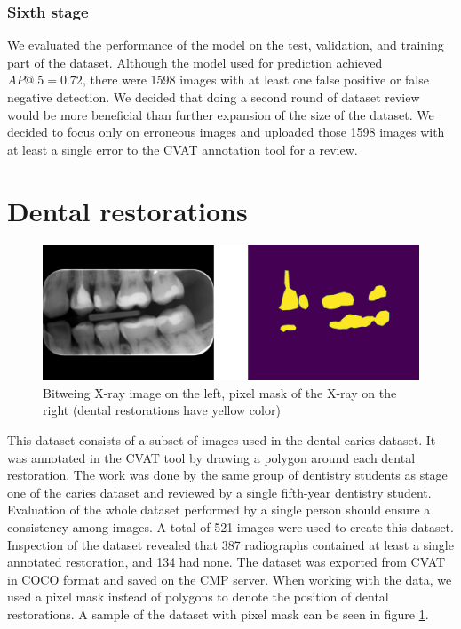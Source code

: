 \subsubsection{Sixth stage}
We evaluated the performance of the model on the test, validation, and training part of the dataset. Although the model used for prediction achieved $AP@.5 = 0.72$, there were 1598 images with at least one false positive or false negative detection. We decided that doing a second round of dataset review would be more beneficial than further expansion of the size of the dataset. We decided to focus only on erroneous images and uploaded those 1598 images with at least a single error to the CVAT annotation tool for a review.


\section{Dental restorations}
\begin{figure}
    \centering
    \includegraphics[width=\linewidth]{images/segmentation_ds_sample.pdf}
    \caption{Bitweing X-ray image on the left, pixel mask of the X-ray on the right (dental restorations have yellow color)}
    \label{fig:segmentation_sample}
\end{figure}
This dataset consists of a subset of images used in the dental caries dataset. It was annotated in the CVAT tool by drawing a polygon around each dental restoration. The work was done by the same group of dentistry students as stage one of the caries dataset and reviewed by a single fifth-year dentistry student. Evaluation of the whole dataset performed by a single person should ensure a consistency among images. A total of 521 images were used to create this dataset. Inspection of the dataset revealed that 387 radiographs contained at least a single annotated restoration, and 134 had none.
The dataset was exported from CVAT in COCO format and saved on the CMP server. When working with the data, we used a pixel mask instead of polygons to denote the position of dental restorations. A sample of the dataset with pixel mask can be seen in figure \ref{fig:segmentation_sample}.


